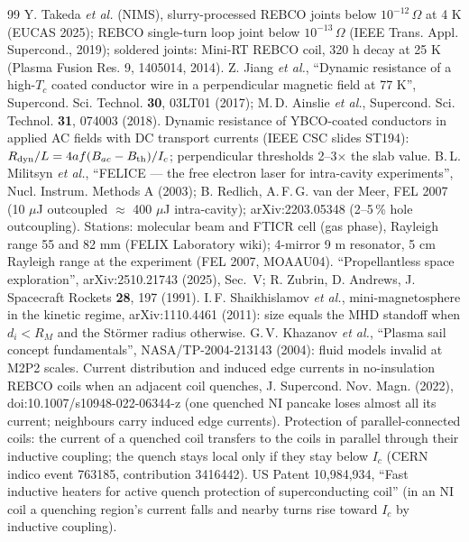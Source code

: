 \begin{thebibliography}{99}
 Y. Takeda \emph{et al.} (NIMS), slurry-processed REBCO joints below $10^{-12}\,\Omega$ at 4 K (EUCAS 2025); REBCO single-turn loop joint below $10^{-13}\,\Omega$ (IEEE Trans. Appl. Supercond., 2019); soldered joints: Mini-RT REBCO coil, 320 h decay at 25 K (Plasma Fusion Res. 9, 1405014, 2014).
 Z. Jiang \emph{et al.}, ``Dynamic resistance of a high-$T_c$ coated conductor wire in a perpendicular magnetic field at 77 K'', Supercond. Sci. Technol. \textbf{30}, 03LT01 (2017); M.\,D. Ainslie \emph{et al.}, Supercond. Sci. Technol. \textbf{31}, 074003 (2018).
 Dynamic resistance of YBCO-coated conductors in applied AC fields with DC transport currents (IEEE CSC slides ST194): $R_{\rm dyn}/L=4af(B_{ac}-B_{\rm th})/I_c$; perpendicular thresholds 2--3$\times$ the slab value.
 B.\,L. Militsyn \emph{et al.}, ``FELICE --- the free electron laser for intra-cavity experiments'', Nucl. Instrum. Methods A (2003); B. Redlich, A.\,F.\,G. van der Meer, FEL 2007 (10 $\mu$J outcoupled $\approx$ 400 $\mu$J intra-cavity); arXiv:2203.05348 (2--5\,\% hole outcoupling). Stations: molecular beam and FTICR cell (gas phase), Rayleigh range 55 and 82 mm (FELIX Laboratory wiki); 4-mirror 9 m resonator, 5 cm Rayleigh range at the experiment (FEL 2007, MOAAU04).
 ``Propellantless space exploration'', arXiv:2510.21743 (2025), Sec.~V; R. Zubrin, D. Andrews, J. Spacecraft Rockets \textbf{28}, 197 (1991).
 I.\,F. Shaikhislamov \emph{et al.}, mini-magnetosphere in the kinetic regime, arXiv:1110.4461 (2011): size equals the MHD standoff when $d_i<R_M$ and the St\"ormer radius otherwise.
 G.\,V. Khazanov \emph{et al.}, ``Plasma sail concept fundamentals'', NASA/TP-2004-213143 (2004): fluid models invalid at M2P2 scales.
 Current distribution and induced edge currents in no-insulation REBCO coils when an adjacent coil quenches, J. Supercond. Nov. Magn. (2022), doi:10.1007/s10948-022-06344-z (one quenched NI pancake loses almost all its current; neighbours carry induced edge currents).
 Protection of parallel-connected coils: the current of a quenched coil transfers to the coils in parallel through their inductive coupling; the quench stays local only if they stay below $I_c$ (CERN indico event 763185, contribution 3416442).
 US Patent 10,984,934, ``Fast inductive heaters for active quench protection of superconducting coil'' (in an NI coil a quenching region's current falls and nearby turns rise toward $I_c$ by inductive coupling).

\end{thebibliography}

